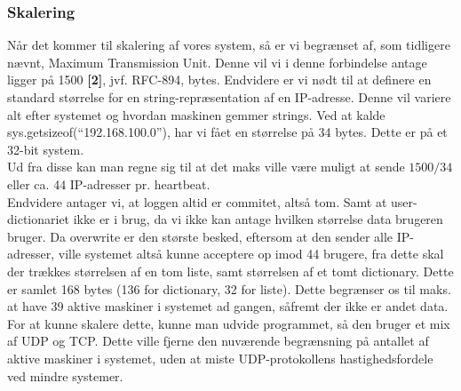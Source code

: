 \documentclass[a4paper,12pt]{article}
\begin{document}
\subsubsection{Skalering}
Når det kommer til skalering af vores system, så er vi begrænset af, som tidligere nævnt, Maximum Transmission Unit. Denne vil vi i denne forbindelse antage ligger på 1500 \textbf{[2]}, jvf. RFC-894, bytes. Endvidere er vi nødt til at definere en standard størrelse for en string-repræsentation af en IP-adresse. Denne vil variere alt efter systemet og hvordan maskinen gemmer strings. Ved at kalde sys.getsizeof(“192.168.100.0”), har vi fået en størrelse på 34 bytes. Dette er på et 32-bit system.
\\[5px]
Ud fra disse kan man regne sig til at det maks ville være muligt at sende $1500 / 34$ eller ca. 44 IP-adresser pr. heartbeat. 
\\ 
Endvidere antager vi, at loggen altid er commitet, altså tom. Samt at user-dictionariet ikke er i brug, da vi ikke kan antage hvilken størrelse data brugeren bruger.
Da overwrite er den største besked, eftersom at den sender alle IP-adresser, ville systemet altså kunne acceptere op imod 44 brugere, fra dette skal der trækkes størrelsen af en tom liste, samt størrelsen af et tomt dictionary. Dette er samlet 168 bytes (136 for dictionary, 32 for liste). 
Dette begrænser os til maks. at have 39 aktive maskiner i systemet ad gangen, såfremt der ikke er andet data.
\\
For at kunne skalere dette, kunne man udvide programmet, så den bruger et mix af UDP og TCP. Dette ville fjerne den nuværende begrænsning på antallet af aktive maskiner i systemet, uden at miste UDP-protokollens hastighedsfordele ved mindre systemer.
\newpage
\end{document}
